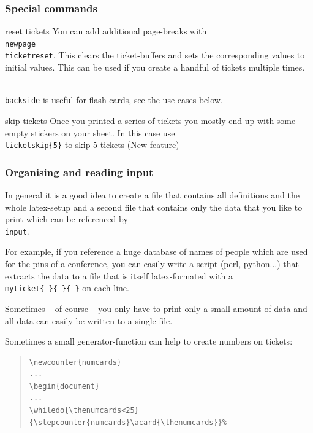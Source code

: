 \documentclass[aspectratio=1610,hyperref={pdfpagelabels=false}]{beamer}
\def\code#1{\texttt{#1}}
\newcommand{\bs}{{\mtt\\}}
\begin{document}
\begin{frame}
  \frametitle{Special commands}
\begin{exampleblock}{reset tickets}
  You can add additional page-breaks with \code{\bs{}newpage\bs{}ticketreset}. This clears the ticket-buffers and sets the corresponding values to initial values.
This can be used if you create a handful of tickets multiple times.
\end{exampleblock}

\begin{exampleblock}{\code{\bs{}backside}}
is useful for flash-cards, see the use-cases below.
\end{exampleblock}

\begin{exampleblock}{skip tickets}
Once you printed a series of tickets you mostly end up with some empty stickers on your sheet. In this case use \code{\bs{}ticketskip\{5\}} to skip 5 tickets (New feature)
\end{exampleblock}
\end{frame}
\begin{frame}[fragile]
  \frametitle{Organising and reading input}
  In general it is a good idea to create a file that contains all definitions and the whole latex-setup and a second file that contains only the data that you like to print which can be referenced by \code{\bs{}input}. 

For example, if you reference a huge database of names of people which are used for the pins of a conference, you can easily write a script (perl, python...) that extracts the data to a file that is itself latex-formated with a \code{\bs{}myticket\{  \}\{  \}\{  \}} on each line.

Sometimes -- of course -- you only have to print only a small amount of data and all data can easily be written to a single file. 

Sometimes a small generator-function can help to create numbers on tickets:

\begin{quote}
    \begin{minipage}[t]{0.5\textwidth}
      {\scriptsize
\begin{verbatim}
\newcounter{numcards}
...
\begin{document}
...
\whiledo{\thenumcards<25}{\stepcounter{numcards}\acard{\thenumcards}}%
\end{verbatim}
        }
    \end{minipage}
\end{quote}
\end{frame}
\end{document}
